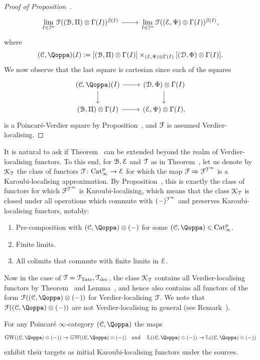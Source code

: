 \begin{proof}[Proof of Proposition~]
\[\begin{tikzcd}
\lim\limits_{I \in \I^n} \F((\cB,\Pi)\otimes \Gamma(I))^{\beta(I)}\ar[r] & \lim\limits_{I \in \I^n} \F((\E,\QFE)\otimes \Gamma(I))^{\beta(I)},
\end{tikzcd}
\]
where
\[
(\C,\QF)(I) := [(\cB,\Pi) \otimes \Gamma(I)] \times_{(\E,\QFE) \otimes \Gamma(I)} [(\D,\QFD) \otimes \Gamma(I)] .
\]
We now observe that the last square is cartesian since each of the squares
\[
\begin{tikzcd}
(\C,\QF)(I) \ar[r]\ar[d] & (\D,\QFD)\otimes \Gamma(I) \ar[d] \\
(\cB,\Pi)\otimes \Gamma(I)\ar[r] & (\E,\QFE)\otimes \Gamma(I),
\end{tikzcd}
\]
is a Poincaré-Verdier square by Proposition~\;,
and $\mathcal{F}$ is assumed Verdier-localising.
\end{proof}

It is natural to ask if Theorem~ can be extended beyond the realm of Verdier-localising functors.
To this end, for $\mathcal{B},\mathcal{E}$ and $\mathcal{T}$ as in Theorem~, let us denote by $\mathcal{K}_{\mathcal{T}}$ the class of functors $\mathcal{F}\colon \mathrm{Cat}^{\mathrm p}_\infty \to \mathcal{E}$ for which the map $\mathcal{F} \Rightarrow \mathcal{F}^{\mathcal{T}^{\infty}}$ is a Karoubi-localising approximation. 
By Proposition~, this is exactly the class of functors for which $\mathcal{F}^{\mathcal{T}^{\infty}}$ is Karoubi-localising, which means that the class $\mathcal{K}_{\mathcal{T}}$ is closed under all operations which commute with $(-)^{\mathcal{T}^{\infty}}$ and preserves Karoubi-localising functors, notably: 
\begin{enumerate}
\item
Pre-composition with $(\C,\QF)\otimes (-)$ for some $(\C,\QF) \in \Catp$.
\item
Finite limits.
\item
All colimits that commute with finite limits in $\mathcal{E}$. 
\end{enumerate}
Now in the case of $\mathcal{T}=\mathcal{T}_{\operatorname{Tate}},\mathcal{T}_{\mathrm{dec}}$, the class $\mathcal{K}_{\mathcal{T}}$ contains all Verdier-localising functors by Theorem~
and Lemma~, and hence also contains all functors of the form $\F((\C,\QF)\otimes (-))$ for Verdier-localising $\mathcal{F}$. We note that $\F((\C,\QF)\otimes (-))$ are not Verdier-localising in general (see Remark~). 

\begin{corollary}
\label{corollary:translated}%
For any Poincaré $\infty$-category $(\C,\QF)$ the maps
\[
\GW((\C,\QF)\otimes(-)) \to \KGW((\C,\QF)\otimes (-)) \quad\text{and}\quad \L((\C,\QF)\otimes (-)) \to \KL((\C,\QF)\otimes(-))
\]
exhibit their targets as initial Karoubi-localising functors under the sources. 
\end{corollary}

